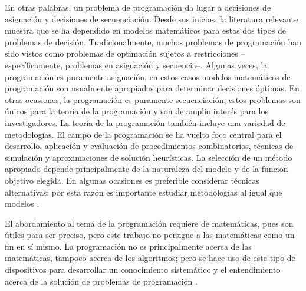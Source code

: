 \documentclass[spanish,draft,12pt,headsepline,footsepline,paper=letter]{scrreprt}
\begin{document}
En otras palabras, un problema de programación da lugar a decisiones de asignación y decisiones de secuenciación. Desde sus inicios, la literatura relevante muestra que se ha dependido en modelos matemáticos para estos dos tipos de problemas de decisión. Tradicionalmente, muchos problemas de programación han sido vistos como problemas de optimación sujetos a restricciones –específicamente, problemas en asignación y secuencia–. Algunas veces, la programación es puramente asignación, en estos casos modelos matemáticos de programación son usualmente apropiados para determinar decisiones óptimas. En otras ocasiones, la programación es puramente secuenciación; estos problemas son únicos para la teoría de la programación y son de amplio interés para los investigadores. La teoría de la programación también incluye una variedad de metodologías. El campo de la programación se ha vuelto foco central para el desarrollo, aplicación y evaluación de procedimientos combinatorios, técnicas de simulación y aproximaciones de solución heurísticas. La selección de un método apropiado depende principalmente de la naturaleza del modelo y de la función objetivo elegida. En algunas ocasiones es preferible considerar técnicas alternativas; por esta razón es importante estudiar metodologías al igual que modelos \citep[p.~4,~5]{Baker2009}.

El abordamiento al tema de la programación requiere de matemáticas, pues son útiles para ser preciso, pero este trabajo no persigue a las matemáticas como un fin en sí mismo. La programación no es principalmente acerca de las matemáticas, tampoco acerca de los algoritmos; pero se hace uso de este tipo de dispositivos para desarrollar un conocimiento sistemático y el entendimiento acerca de la solución de problemas de programación \citep[p.~8]{Baker2009}.

\end{document}
